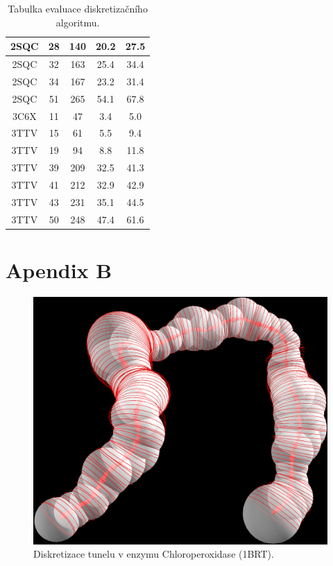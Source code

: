 \begin{table}
\begin{tabular}{||c | c c c c||}
        2SQC & 28 & 140 & 20.2 & 27.5 \\
        \hline
        2SQC & 32 & 163 & 25.4 & 34.4 \\
        \hline
        2SQC & 34 & 167 & 23.2 & 31.4 \\
        \hline
        2SQC & 51 & 265 & 54.1 & 67.8 \\
        \hline
        3C6X & 11 & 47 & 3.4 & 5.0 \\
        \hline
        3TTV & 15 & 61 & 5.5 & 9.4 \\
        \hline
        3TTV & 19 & 94 & 8.8 & 11.8 \\
        \hline
        3TTV & 39 & 209 & 32.5 & 41.3 \\
        \hline
        3TTV & 41 & 212 & 32.9 & 42.9 \\
        \hline
        3TTV & 43 & 231 & 35.1 & 44.5 \\
        \hline
        3TTV & 50 & 248 & 47.4 & 61.6 \\
        \hline
    \end{tabular}
    \caption{Tabulka evaluace diskretizačního algoritmu.}
\end{table}




\clearpage
\section*{Apendix B}
\begin{figure}[ht]
    \centering
    \includegraphics[width=1\textwidth]{img/1BRT.png}
    \caption{Diskretizace tunelu v enzymu Chloroperoxidase (1BRT).}
  \centering
  \label{fig:1BRT}
\end{figure}
